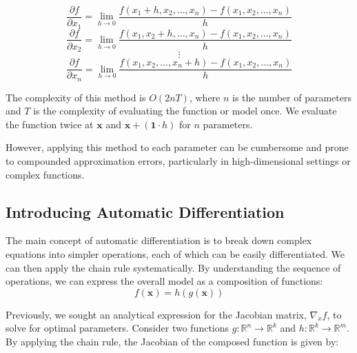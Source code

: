 \[
    \frac{\partial f}{\partial x_1} = \lim_{h \to 0} \frac{f(x_1 + h, x_2, \dots, x_n) - f(x_1, x_2, \dots, x_n)}{h}
\]
\[
    \frac{\partial f}{\partial x_2} = \lim_{h \to 0} \frac{f(x_1, x_2 + h, \dots, x_n) - f(x_1, x_2, \dots, x_n)}{h}
\]
\[
    \vdots
\]
\[
    \frac{\partial f}{\partial x_n} = \lim_{h \to 0} \frac{f(x_1, x_2, \dots, x_n + h) - f(x_1, x_2, \dots, x_n)}{h}
\]

The complexity of this method is $O(2nT)$, where $n$ is the number of parameters and $T$ is the complexity of evaluating the function or model once. We evaluate the function twice at $\bm{x}$ and $\bm{x} + (\bm{1} \cdot h)$ for $n$ parameters.\bigskip

However, applying this method to each parameter can be cumbersome and prone to compounded approximation errors, particularly in high-dimensional settings or complex functions.


\subsection{Introducing Automatic Differentiation}



The main concept of automatic differentiation is to break down complex equations into simpler operations, each of which can be easily differentiated. We can then apply the chain rule systematically. By understanding the sequence of operations, we can express the overall model as a composition of functions:
\[
    f(\bm{x}) = h(g(\bm{x}))
\]


Previously, we sought an analytical expression for the Jacobian matrix, \( \nabla_x f \), to solve for optimal parameters. Consider two functions \( g: \mathbb{R}^n \to \mathbb{R}^k \) and \( h: \mathbb{R}^k \to \mathbb{R}^m \). By applying the chain rule, the Jacobian of the composed function is given by:


